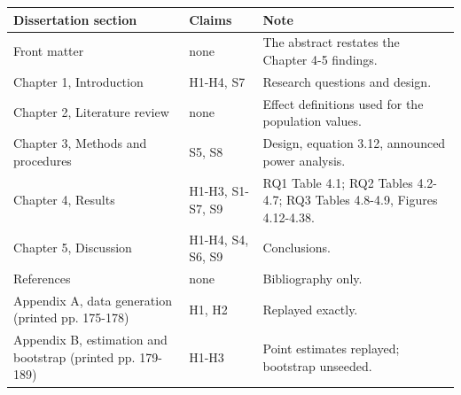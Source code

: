 {\footnotesize
\begin{longtable}{@{}>{\raggedright\arraybackslash}p{}>{\raggedright\arraybackslash}p{}>{\raggedright\arraybackslash}p{}@{}}
\toprule
Dissertation section & Claims & Note\\
\midrule\endhead
Front matter & none & The abstract restates the Chapter 4-5 findings.\\
Chapter 1, Introduction & H1-H4, S7 & Research questions and design.\\
Chapter 2, Literature review & none & Effect definitions used for the population values.\\
Chapter 3, Methods and procedures & S5, S8 & Design, equation 3.12, announced power analysis.\\
Chapter 4, Results & H1-H3, S1-S7, S9 & RQ1 Table 4.1; RQ2 Tables 4.2-4.7; RQ3 Tables 4.8-4.9, Figures 4.12-4.38.\\
Chapter 5, Discussion & H1-H4, S4, S6, S9 & Conclusions.\\
References & none & Bibliography only.\\
Appendix A, data generation (printed pp. 175-178) & H1, H2 & Replayed exactly.\\
Appendix B, estimation and bootstrap (printed pp. 179-189) & H1-H3 & Point estimates replayed; bootstrap unseeded.\\
\bottomrule
\end{longtable}}


